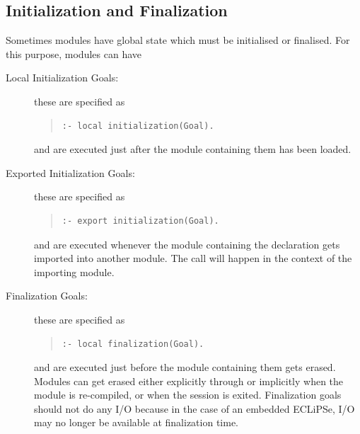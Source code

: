 \subsection{Initialization and Finalization\label{initfini}}
Sometimes modules have global state which must be initialised
or finalised. For this purpose, modules can have
\begin{description}
\item[Local Initialization Goals:]
these are specified as
\begin{quote}
\begin{verbatim}
:- local initialization(Goal).
\end{verbatim}
\end{quote}
and are executed just after the module containing them has been loaded.
\item[Exported Initialization Goals:]
these are specified as
\begin{quote}
\begin{verbatim}
:- export initialization(Goal).
\end{verbatim}
\end{quote}
and are executed whenever the module containing the declaration gets
imported into another module. The call will happen in the context of
the importing module.
\item[Finalization Goals:]
these are specified as
\begin{quote}
\begin{verbatim}
:- local finalization(Goal).
\end{verbatim}
\end{quote}
and are executed just before the module containing them gets erased.
Modules can get erased either explicitly through
or implicitly when the module is re-compiled, or when the {\eclipse}
session is exited.  Finalization goals should not do any I/O because
in the case of an embedded ECLiPSe, I/O may no longer be available at
finalization time.

\end{description}

